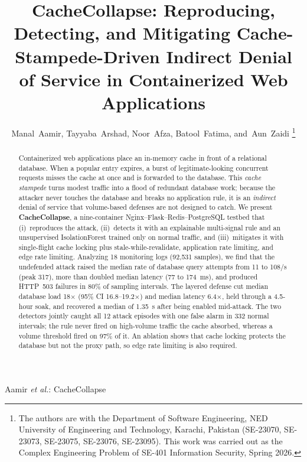 \documentclass[journal]{IEEEtran}
\begin{document}
\title{CacheCollapse: Reproducing, Detecting, and Mitigating Cache-Stampede-Driven
Indirect Denial of Service in Containerized Web Applications}

\author{Manal~Aamir, Tayyaba~Arshad, Noor~Afza, Batool~Fatima, and~Aun~Zaidi%
\thanks{The authors are with the Department of Software Engineering, NED University
of Engineering and Technology, Karachi, Pakistan (SE-23070, SE-23073, SE-23075,
SE-23076, SE-23095). This work was carried out as the Complex Engineering Problem of
SE-401 Information Security, Spring 2026.}}

%
{Aamir \MakeLowercase{\textit{et al.}}: CacheCollapse}

\maketitle

\begin{abstract}
Containerized web applications place an in-memory cache in front of a relational
database. When a popular entry expires, a burst of legitimate-looking concurrent
requests misses the cache at once and is forwarded to the database. This \emph{cache
stampede} turns modest traffic into a flood of redundant database work; because the
attacker never touches the database and breaks no application rule, it is an
\emph{indirect} denial of service that volume-based defenses are not designed to
catch. We present \textbf{CacheCollapse}, a nine-container
Nginx--Flask--Redis--PostgreSQL testbed that (i)~reproduces the attack, (ii)~detects
it with an explainable multi-signal rule and an unsupervised IsolationForest trained
only on normal traffic, and (iii)~mitigates it with single-flight cache locking plus
stale-while-revalidate, application rate limiting, and edge rate limiting. Analyzing
18 monitoring logs (92{,}531 samples), we find that the undefended attack raised the
median rate of database query attempts from 11 to 108/s (peak 317), more than doubled
median latency (77 to 174~ms), and produced HTTP~503 failures in 80\% of sampling
intervals. The layered defense cut median database load 18$\times$ (95\% CI
16.8--19.2$\times$) and median latency 6.4$\times$, held through a 4.5-hour soak, and
recovered a median of 1.35~s after being enabled mid-attack. The two detectors jointly
caught all 12 attack episodes with one false alarm in 332 normal intervals; the rule
never fired on high-volume traffic the cache absorbed, whereas a volume threshold fired
on 97\% of it. An ablation shows that cache locking protects the database but not the
proxy path, so edge rate limiting is also required.
\end{abstract}
\end{document}

